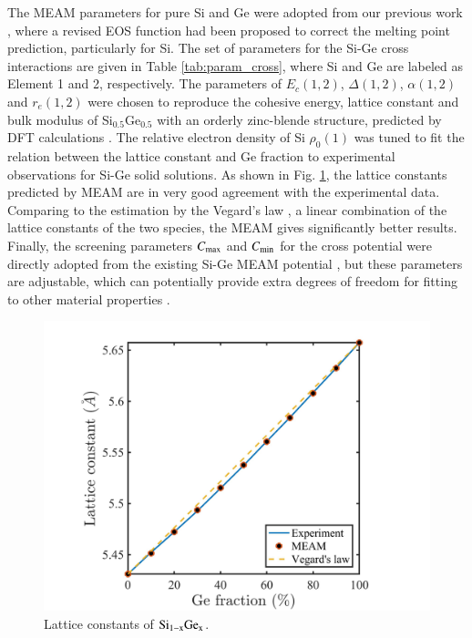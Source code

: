 \documentclass[review]{elsarticle}
\begin{document}
{The MEAM parameters for pure Si and Ge were adopted from our previous work \cite{wang2016ge,ryu2009improved}, where a revised EOS function had been proposed to correct the melting point prediction, particularly for Si. The set of parameters for the Si-Ge cross interactions are given in Table \ref{tab:param_cross}, where Si and Ge are labeled as Element 1 and 2, respectively. The parameters of $E_c(1,2)$, $\Delta(1,2)$, $\alpha(1,2)$ and $r_e(1,2)$ were chosen to reproduce the cohesive energy, lattice constant and bulk modulus of Si$_{0.5}$Ge$_{0.5}$ with an orderly zinc-blende structure, predicted by DFT calculations \cite{grochola2010modified}. The relative electron density of Si $\rho_0(1)$ was tuned to fit the relation between the lattice constant and Ge fraction to experimental observations for Si-Ge solid solutions. As shown in Fig. \ref{fig:lattice_const}, the lattice constants predicted by MEAM are in very good agreement with the experimental data. Comparing to the estimation by the Vegard's law \cite{XXX}, a linear combination of the lattice constants of the two species, the MEAM gives significantly better results. Finally, the screening parameters $C_{\rm max}$ and $C_{\rm min}$ for the cross potential were directly adopted from the existing Si-Ge MEAM potential \cite{grochola2010modified}, but these parameters are adjustable, which can potentially provide extra degrees of freedom for fitting to other material properties \cite{wang2016ge,ryu2009improved}. 

 


\begin{figure}[H]
\centering
\includegraphics[trim = 0 0 0 2cm, clip, width=.5\linewidth]{Figures/latt_SiGe.jpg}
\caption{Lattice constants of $\rm Si_{1-x}Ge_x$.}
\label{fig:lattice_const}
\end{figure}

}
\end{document}
